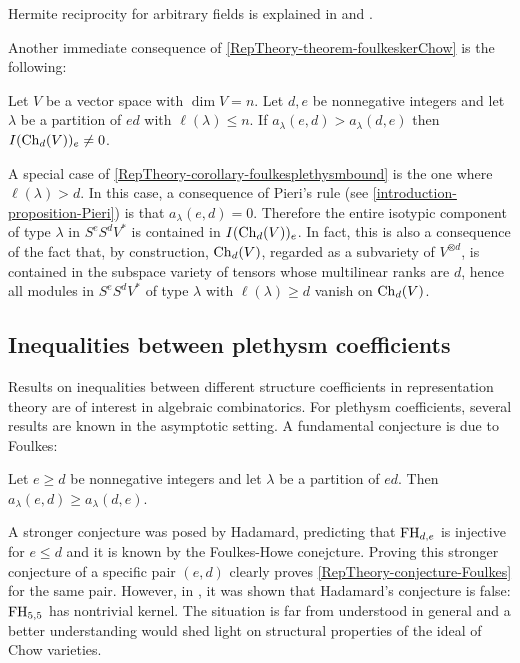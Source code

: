 Hermite reciprocity for arbitrary fields is explained in \cite[Sec.~3.4]{AFPRW19} and \cite{RS21,MW22}.


Another immediate consequence of \ref{RepTheory-theorem-foulkeskerChow} is the following:
\begin{corollary}
\label{RepTheory-corollary-foulkesplethysmbound}
Let $V$ be a vector space with $\dim V =n$. Let $d,e$ be nonnegative integers and let $\lambda$ be a partition of $ed$ with $\ell(\lambda) \leq n$. If $a_\lambda(e,d) > a_\lambda(d,e)$ then $I(\mathrm{Ch}_d(V))_e \neq 0$.
\end{corollary}
A special case of \ref{RepTheory-corollary-foulkesplethysmbound} is the one where $\ell(\lambda) > d$. In this case, a consequence of Pieri's rule (see \ref{introduction-proposition-Pieri}) is that $a_\lambda(e,d) = 0$. Therefore the entire isotypic component of type $\lambda$ in $S^e S^d V^*$ is contained in $I(\mathrm{Ch}_d(V))_e$. In fact, this is also a consequence of the fact that, by construction, $\mathrm{Ch}_d(V)$, regarded as a subvariety of $V^{\otimes d}$, is contained in the subspace variety of tensors whose multilinear ranks are $d$, hence all modules in $S^eS^d V^*$ of type $\lambda$ with $\ell(\lambda) \geq d$ vanish on $\mathrm{Ch}_d(V)$.

\subsection{Inequalities between plethysm coefficients}
\label{RepTheory-subsection-plethysmInequalities}
Results on inequalities between different structure coefficients in representation theory are of interest in algebraic combinatorics. For plethysm coefficients, several results are known in the asymptotic setting. A fundamental conjecture is due to Foulkes:
\begin{conjecture}
 \label{RepTheory-conjecture-Foulkes}
 Let $e \geq d$ be nonnegative integers and let $\lambda$ be a partition of $ed$. Then $a_\lambda (e,d) \geq a_\lambda(d,e)$.
\end{conjecture}
A stronger conjecture was posed by Hadamard, predicting that $\mathrm{FH}_{d,e}$ is injective for $e \leq d$ and it is known by the Foulkes-Howe conejcture. Proving this stronger conjecture of a specific pair $(e,d)$ clearly proves \ref{RepTheory-conjecture-Foulkes} for the same pair. However, in \cite{MN05}, it was shown that Hadamard's conjecture is false: $\mathrm{FH}_{5,5}$ has nontrivial kernel. The situation is far from understood in general and a better understanding would shed light on structural properties of the ideal of Chow varieties.


